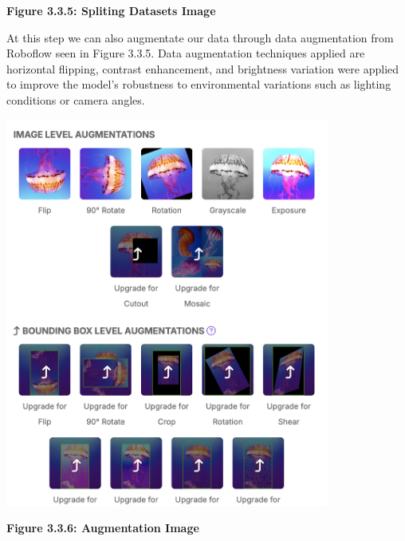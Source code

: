 \begin{itemize}
\begin{center}
		\vspace{0.5em}
		\textbf{Figure 3.3.5: Spliting Datasets Image}
	\end{center}
	At this step we can also augmentate our data through data augmentation from Roboflow seen in Figure 3.3.5. Data augmentation techniques applied are horizontal flipping, contrast enhancement, and brightness variation were applied to improve the model’s robustness to environmental variations such as lighting conditions or camera angles.
	\begin{center}
		\includegraphics[width=0.8\textwidth]{Augmentation.png}
		
		\vspace{0.5em}
		\textbf{Figure 3.3.6: Augmentation Image}
	\end{center}
	

\end{itemize}
